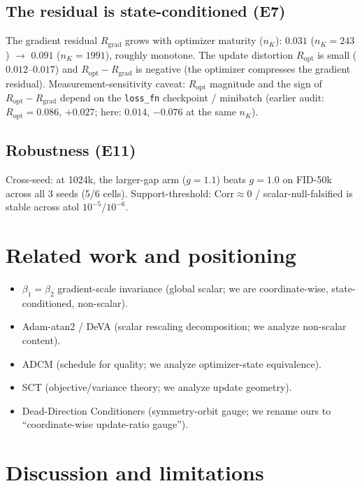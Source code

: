 \documentclass[11pt,a4paper]{article}
\begin{document}
\subsection{The residual is state-conditioned (E7)}
The gradient residual $R_{\mathrm{grad}}$ grows with optimizer maturity
($n_K$): $0.031$ ($n_K=243$) $\to$ $0.091$ ($n_K=1991$), roughly monotone. The
update distortion $R_{\mathrm{opt}}$ is small ($0.012$--$0.017$) and
$R_{\mathrm{opt}}-R_{\mathrm{grad}}$ is negative (the optimizer compresses the
gradient residual). Measurement-sensitivity caveat: $R_{\mathrm{opt}}$ magnitude
and the sign of $R_{\mathrm{opt}}-R_{\mathrm{grad}}$ depend on the
\texttt{loss\_fn} checkpoint / minibatch (earlier audit:
$R_{\mathrm{opt}}=0.086$, $+0.027$; here: $0.014$, $-0.076$ at the same
$n_K$).

\subsection{Robustness (E11)}
Cross-seed: at 1024k, the larger-gap arm ($g=1.1$) beats $g=1.0$ on FID-50k
across all 3 seeds (5/6 cells). Support-threshold: $\mathrm{Corr}\approx 0$ /
scalar-null-falsified is stable across atol $10^{-5}$/$10^{-6}$.

\section{Related work and positioning}
\label{sec:related}

\begin{itemize}
  \item $\beta_1{=}\beta_2$ gradient-scale invariance (global scalar; we are
        coordinate-wise, state-conditioned, non-scalar).
  \item Adam-atan2 / DeVA (scalar rescaling decomposition; we analyze non-scalar
        content).
  \item ADCM (schedule for quality; we analyze optimizer-state equivalence).
  \item SCT (objective/variance theory; we analyze update geometry).
  \item Dead-Direction Conditioners (symmetry-orbit gauge; we rename ours to
        ``coordinate-wise update-ratio gauge'').
\end{itemize}

\section{Discussion and limitations}
\label{sec:discussion}
\end{document}
